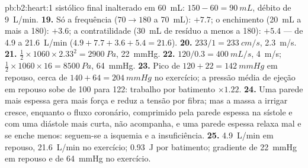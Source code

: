 \begin{solution}{pb:b2:heart:1}
{sistólico} final inalterado em \qty{60}{mL}: 
$150 - 60 = \qty{90}{mL}$, débito de \qty{9}{L/min}.
\textbf{19.} Só a frequência ($70 \to 180$ a \qty{70}{mL}): $+7.7$;
o enchimento (\qty{20}{mL} a mais a 180): $+3.6$; a contratilidade
(\qty{30}{mL} de resíduo a menos a 180): $+5.4$ --- de 4.9 a
\qty{21.6}{L/min} ($4.9 + 7.7 + 3.6 + 5.4 = 21.6$).
\textbf{20.} $233/1 = \qty{233}{cm/s}$, \qty{2.3}{m/s}.
\textbf{21.} $\tfrac12\times 1060\times 2.33^{2} = \qty{2900}{Pa}$,
\qty{22}{mmHg}.
\textbf{22.} $120/0.3 = \qty{400}{mL/s}$, \qty{4}{m/s}; $\tfrac12\times
1060\times 16 = \qty{8500}{Pa}$, \qty{64}{mmHg}.
\textbf{23.} Pico de $120 + 22 = \qty{142}{mmHg}$ em repouso, cerca de
$140 +
64 = \qty{204}{mmHg}$ no exercício; a pressão média de ejeção em repouso
sobe de 100 para 122: trabalho por batimento $\times 1.22$.
\textbf{24.} Uma parede mais espessa gera mais força e reduz a tensão
por fibra; mas a massa a irrigar cresce, enquanto o fluxo coronário,
comprimido pela parede espessa na sístole e com uma diástole mais curta,
não acompanha, e uma parede espessa relaxa mal e se enche menos:
seguem-se a isquemia e a insuficiência.
\textbf{25.} \qty{4.9}{L/min} em repouso, \qty{21.6}{L/min} no
exercício; \qty{0.93}{J} por batimento; gradiente de \qty{22}{mmHg} em
repouso e de \qty{64}{mmHg} no exercício.
\end{solution}
